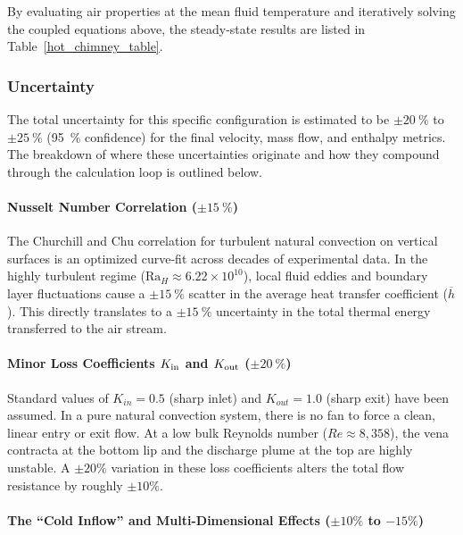 \documentclass[11pt]{book}
\begin{document}
By evaluating air properties at the mean fluid temperature and iteratively solving the coupled equations above, the steady-state results are listed in Table~\ref{hot_chimney_table}.



\subsubsection{Uncertainty}

The total uncertainty for this specific configuration is estimated to be $\pm 20~\%$ to $\pm25~\%$ (95~\% confidence) for the final velocity, mass flow, and enthalpy metrics. The breakdown of where these uncertainties originate and how they compound through the calculation loop is outlined below.

\paragraph{Nusselt Number Correlation ($\pm 15~\%$)}

The Churchill and Chu correlation for turbulent natural convection on vertical surfaces is an optimized curve-fit across decades of experimental data. In the highly turbulent regime ($\text{Ra}_H \approx 6.22 \times 10^{10}$), local fluid eddies and boundary layer fluctuations cause a $\pm 15~\%$ scatter in the average heat transfer coefficient ($\overline{h}$). This directly translates to a $\pm 15~\%$ uncertainty in the total thermal energy transferred to the air stream.

\paragraph{Minor Loss Coefficients $K_{\rm in}$ and $K_{\rm out}$ ($\pm 20~\%$)}

Standard values of $K_{in} = 0.5$ (sharp inlet) and $K_{out} = 1.0$ (sharp exit) have been assumed. In a pure natural convection system, there is no fan to force a clean, linear entry or exit flow. At a low bulk Reynolds number ($Re \approx 8,358$), the vena contracta at the bottom lip and the discharge plume at the top are highly unstable. A $\pm 20\%$ variation in these loss coefficients alters the total flow resistance by roughly $\pm 10\%$.

\paragraph{The ``Cold Inflow'' and Multi-Dimensional Effects ($\pm 10\%$ to $-15\%$)} 
\end{document}
